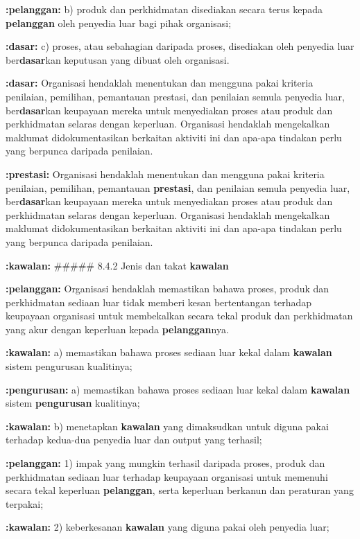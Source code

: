 \documentclass{article}
\begin{document}
\textbf{:pelanggan:} b) produk dan perkhidmatan disediakan secara terus kepada \textbf{pelanggan} oleh penyedia luar
bagi pihak organisasi;

\textbf{:dasar:} c) proses, atau sebahagian daripada proses, disediakan oleh penyedia luar ber\textbf{dasar}kan
keputusan yang dibuat oleh organisasi.

\textbf{:dasar:} Organisasi hendaklah menentukan dan mengguna pakai kriteria penilaian, pemilihan,
pemantauan prestasi, dan penilaian semula penyedia luar, ber\textbf{dasar}kan keupayaan mereka
untuk menyediakan proses atau produk dan perkhidmatan selaras dengan keperluan.
Organisasi hendaklah mengekalkan maklumat didokumentasikan berkaitan aktiviti ini dan
apa-apa tindakan perlu yang berpunca daripada penilaian.

\textbf{:prestasi:} Organisasi hendaklah menentukan dan mengguna pakai kriteria penilaian, pemilihan,
pemantauan \textbf{prestasi}, dan penilaian semula penyedia luar, ber\textbf{dasar}kan keupayaan mereka
untuk menyediakan proses atau produk dan perkhidmatan selaras dengan keperluan.
Organisasi hendaklah mengekalkan maklumat didokumentasikan berkaitan aktiviti ini dan
apa-apa tindakan perlu yang berpunca daripada penilaian.

\textbf{:kawalan:} \#\#\#\#\# 8.4.2 Jenis dan takat \textbf{kawalan}

\textbf{:pelanggan:} Organisasi hendaklah memastikan bahawa proses, produk dan perkhidmatan sediaan luar
tidak memberi kesan bertentangan terhadap keupayaan organisasi untuk membekalkan
secara tekal produk dan perkhidmatan yang akur dengan keperluan kepada \textbf{pelanggan}nya.

\textbf{:kawalan:} a) memastikan bahawa proses sediaan luar kekal dalam \textbf{kawalan} sistem pengurusan
kualitinya;

\textbf{:pengurusan:} a) memastikan bahawa proses sediaan luar kekal dalam \textbf{kawalan} sistem \textbf{pengurusan}
kualitinya;

\textbf{:kawalan:} b) menetapkan \textbf{kawalan} yang dimaksudkan untuk diguna pakai terhadap kedua-dua
penyedia luar dan output yang terhasil;

\textbf{:pelanggan:} 1) impak yang mungkin terhasil daripada proses, produk dan perkhidmatan sediaan luar
terhadap keupayaan organisasi untuk memenuhi secara tekal keperluan \textbf{pelanggan},
serta keperluan berkanun dan peraturan yang terpakai;

\textbf{:kawalan:} 2) keberkesanan \textbf{kawalan} yang diguna pakai oleh penyedia luar;
\end{document}
